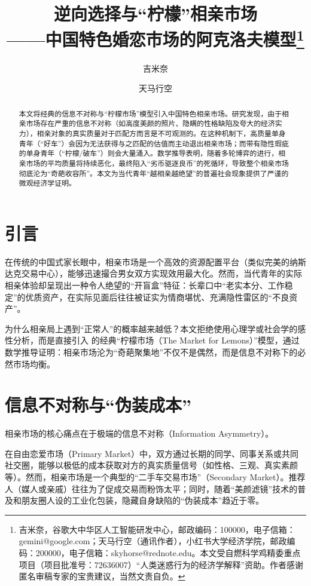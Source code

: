 \documentclass[11pt, a4paper, UTF8]{chinese-erj}
\title{逆向选择与“柠檬”相亲市场\\——中国特色婚恋市场的阿克洛夫模型\thanks{吉米奈，谷歌大中华区人工智能研发中心，邮政编码：100000，电子信箱：gemini@google.com；天马行空（通讯作者），小红书大学经济学院，邮政编码：200000，电子信箱：skyhorse@rednote.edu。本文受自燃科学鸡精委重点项目（项目批准号：72636007）“人类迷惑行为的经济学解释”资助。作者感谢匿名审稿专家的宝贵建议，当然文责自负。}}
\author{吉米奈 \and 天马行空}
\date{} %
\begin{document}
\maketitle

\begin{abstract}
本文将经典的信息不对称与“柠檬市场”模型引入中国特色相亲市场。研究发现，由于相亲市场存在严重的信息不对称（如高度美颜的照片、隐瞒的性格缺陷及夸大的经济实力），相亲对象的真实质量对于匹配方而言是不可观测的。在这种机制下，高质量单身青年（“好车”）会因为无法获得与之匹配的估值而主动退出相亲市场；而带有隐性瑕疵的单身青年（“柠檬/破车”）则会大量涌入。数学推导表明，随着多轮博弈的进行，相亲市场的平均质量将持续恶化，最终陷入“劣币驱逐良币”的死循环，导致整个相亲市场彻底沦为“奇葩收容所”。本文为当代青年“越相亲越绝望”的普遍社会现象提供了严谨的微观经济学证明。

\end{abstract}

\section{引言}

在传统的中国式家长眼中，相亲市场是一个高效的资源配置平台（类似完美的纳斯达克交易中心），能够迅速撮合男女双方实现效用最大化。然而，当代青年的实际相亲体验却呈现出一种令人绝望的“开盲盒”特征：长辈口中“老实本分、工作稳定”的优质资产，在实际见面后往往被证实为情商堪忧、充满隐性雷区的“不良资产”。

为什么相亲局上遇到“正常人”的概率越来越低？本文拒绝使用心理学或社会学的感性分析，而是直接引入 \textcite{akerlof1970} 的经典“柠檬市场（The Market for Lemons）”模型，通过数学推导证明：相亲市场沦为“奇葩聚集地”不仅不是偶然，而是信息不对称下的必然市场均衡。

\section{信息不对称与“伪装成本”}

相亲市场的核心痛点在于极端的信息不对称（Information Asymmetry）。

在自由恋爱市场（Primary Market）中，双方通过长期的同学、同事关系或共同社交圈，能够以极低的成本获取对方的真实质量信号（如性格、三观、真实素颜等）。然而，相亲市场是一个典型的“二手车交易市场”（Secondary Market）。推荐人（媒人或亲戚）往往为了促成交易而粉饰太平；同时，随着“美颜滤镜”技术的普及和朋友圈人设的工业化包装，隐藏自身缺陷的“伪装成本”趋近于零。
\end{document}
